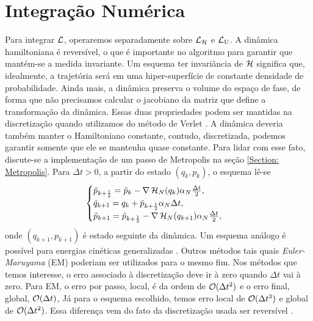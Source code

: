 \section{Integração Numérica}
\label{Seção: Discretização}

Para integrar $\operatorname{\mathcal{L}}$, operaremos separadamente sobre $\operatorname{\mathcal{L}}_{\operatorname{\mathcal{H}}}$ e $\operatorname{\mathcal{L}}_{\operatorname{U}}$. A dinâmica hamiltoniana é reversível, o que é importante no algoritmo para garantir que mantém-se a medida invariante.  Um esquema ter invariância de $\operatorname{\mathcal{H}}$ significa que, idealmente, a trajetória será em uma hiper-superfície de constante densidade de probabilidade. Ainda mais, a dinâmica preserva o volume do espaço de fase, de forma que não precisamos calcular o jacobiano da matriz que define a transformação da dinâmica. Essas duas propriedades podem ser mantidas na discretização quando utilizamos do método de Verlet \cite{Chafa2018}\cite[Capítulo~2]{leimmolecular}. A dinâmica deveria também manter o Hamiltoniano constante, contudo, discretizada, podemos garantir somente que ele se mantenha quase constante. Para lidar com esse fato, discute-se a implementação de um passo de Metropolis na seção \ref{Section: Metropolis}. Para $\Delta t > 0$, a partir do estado $(q_k, p_k)$, o esquema lê-se
\begin{equation}
\begin{cases}
	\tilde{p}_{k+\frac{1}{2}} = \tilde{p}_k - \nabla \operatorname{\mathcal{H}}_N(q_k) \alpha_N \frac{\Delta t}{2}, \\
	\tilde{q}_{k+1} = q_k + \tilde{p}_{k + \frac{1}{2}} \alpha_N \Delta t, \\
	\tilde{p}_{k+1} = \tilde{p}_{k+\frac{1}{2}} - \nabla \operatorname{\mathcal{H}}_N(q_{k+1}) \alpha_N \frac{\Delta t}{2},
\end{cases}
\label{Equation: Verlet}
\end{equation}
onde $(q_{k+1}, p_{k+1})$ é estado seguinte da dinâmica. Um esquema análogo é possível para energias cinéticas generalizadas \cite{Stoltz2018}. Outros métodos tais quais \textit{Euler-Maruyama} (EM) \cite[Capítulo~7]{leimmolecular} poderiam ser utilizados para o mesmo fim. Nos métodos que temos interesse, o erro associado à discretização deve ir à zero quando $\Delta t$ vai à zero. Para EM, o erro por passo, local, é da ordem de $\mathcal{O}{(\Delta t^2)}$ e o erro final, global, $\mathcal{O}{(\Delta t)}$, Já para o esquema escolhido, temos erro local de  $\mathcal{O}{(\Delta t^3)}$ e global de  $\mathcal{O}{(\Delta t^2)}$. Essa diferença vem do fato da discretização usada ser reversível \cite[Capítulo~5]{handbookmontecarlo}. 

